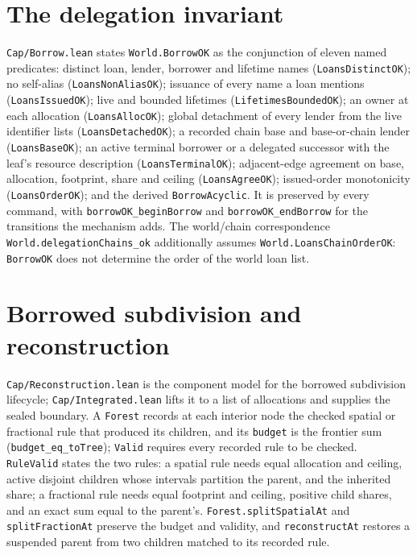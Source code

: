 \documentclass[10pt,a4paper]{article}
\newcommand{\file}[1]{\texttt{\small #1}}
\begin{document}
\section{The delegation invariant}

\file{Cap/Borrow.lean} states \texttt{World.BorrowOK} as the conjunction of
eleven named predicates: distinct loan, lender, borrower and lifetime names
(\texttt{LoansDistinctOK}); no self-alias (\texttt{LoansNonAliasOK}); issuance of
every name a loan mentions (\texttt{LoansIssuedOK}); live and bounded lifetimes
(\texttt{LifetimesBoundedOK}); an owner at each allocation
(\texttt{LoansAllocOK}); global detachment of every lender from the live
identifier lists (\texttt{LoansDetachedOK}); a recorded chain base and
base-or-chain lender (\texttt{LoansBaseOK}); an active terminal borrower or a
delegated successor with the leaf's resource description
(\texttt{LoansTerminalOK}); adjacent-edge agreement on base, allocation,
footprint, share and ceiling (\texttt{LoansAgreeOK}); issued-order monotonicity
(\texttt{LoansOrderOK}); and the derived \texttt{BorrowAcyclic}. It is preserved
by every command, with \texttt{borrowOK\_beginBorrow} and
\texttt{borrowOK\_endBorrow} for the transitions the mechanism adds. The
world/chain correspondence \texttt{World.delegationChains\_ok} additionally
assumes \texttt{World.LoansChainOrderOK}: \texttt{BorrowOK} does not determine
the order of the world loan list.

\section{Borrowed subdivision and reconstruction}\label{sec:reconstruction}

\file{Cap/Reconstruction.lean} is the component model for the borrowed
subdivision lifecycle; \file{Cap/Integrated.lean} lifts it to a list of
allocations and supplies the sealed boundary. A \texttt{Forest} records at each interior node the
checked spatial or fractional rule that produced its children, and its
\texttt{budget} is the frontier sum (\texttt{budget\_eq\_toTree}); \texttt{Valid}
requires every recorded rule to be checked. \texttt{RuleValid} states the two
rules: a spatial rule needs equal allocation and ceiling, active disjoint
children whose intervals partition the parent, and the inherited share; a
fractional rule needs equal footprint and ceiling, positive child shares, and an
exact sum equal to the parent's. \texttt{Forest.splitSpatialAt} and
\texttt{splitFractionAt} preserve the budget and validity, and
\texttt{reconstructAt} restores a suspended parent from two children matched to
its recorded rule.
\end{document}
